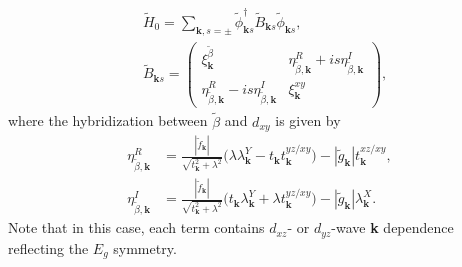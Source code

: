 \documentclass[%
reprint,
superscriptaddress,
 amsmath,amssymb,
 aps,
prb,
nobalancelastpage,
]{revtex4-2}
\begin{document}
\begin{equation}
\begin{aligned}
&\widetilde{H}_{0}=\sum_{\textbf{k},s=\pm}\widetilde{\phi}_{\textbf{k}s}^{\dagger}\widetilde{B}_{\textbf{k}s}\widetilde{\phi}_{\textbf{k}s},\\[6pt]
&\widetilde{B}_{\textbf{k}s} = 
 \begin{pmatrix} 
    \xi_{\textbf{k}}^{\widetilde{\beta}} & \eta_{\widetilde{\beta},\textbf{k}}^{R}+is\eta_{\widetilde{\beta},\textbf{k}}^{I}  \\[7pt]
     \eta_{\widetilde{\beta},\textbf{k}}^{R}-is\eta_{\widetilde{\beta},\textbf{k}}^{I} & \xi_{\textbf{k}}^{xy}
\end{pmatrix},
\end{aligned}
\end{equation}
where the hybridization between $\widetilde{\beta}$ and $d_{xy}$ is given by
\begin{equation}
\begin{aligned}
\eta_{\widetilde{\beta},\textbf{k}}^{R} &= \frac{|\tilde{f}_{\textbf{k}}|}{\sqrt{t_{\textbf{k}}^2+\lambda^2}}\bigl(\lambda\lambda_{\textbf{k}}^{Y}-t_{\textbf{k}}t_{\textbf{k}}^{yz/xy}\bigr)-|\tilde{g}_{\textbf{k}}|t_{\textbf{k}}^{xz/xy} ,\\
\eta_{\widetilde{\beta},\textbf{k}}^{I} &= \frac{|\tilde{f}_{\textbf{k}}|}{\sqrt{t_{\textbf{k}}^2+\lambda^2}}\bigl(t_{\textbf{k}}\lambda_{\textbf{k}}^{Y} + \lambda t_{\textbf{k}}^{yz/xy}\bigr) - |\tilde{g}_{\textbf{k}}|\lambda_{\textbf{k}}^{X}.
\end{aligned}
\end{equation}
Note that in this case, each term contains $d_{xz}$- or $d_{yz}$-wave \textbf{k} dependence reflecting the $E_{g}$ symmetry.
\end{document}
